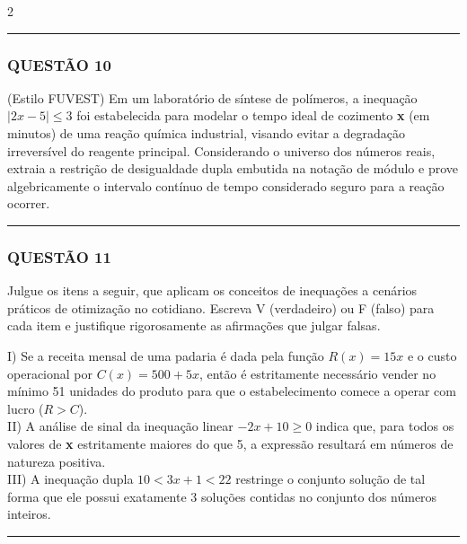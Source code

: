 \documentclass[11pt, a4paper]{article}
\begin{document}
\begin{multicols*}{2}
\vspace{0cm} \noindent\textcolor{CorLinha}{\rule{\linewidth}{0.5pt}} \vspace{-0.2cm}
\subsubsection*{QUESTÃO 10}
(Estilo FUVEST) Em um laboratório de síntese de polímeros, a inequação $ |2x - 5| \le 3 $ foi estabelecida para modelar o tempo ideal de cozimento \textbf{x} (em minutos) de uma reação química industrial, visando evitar a degradação irreversível do reagente principal. Considerando o universo dos números reais, extraia a restrição de desigualdade dupla embutida na notação de módulo e prove algebricamente o intervalo contínuo de tempo considerado seguro para a reação ocorrer.

\vspace{0cm} \noindent\textcolor{CorLinha}{\rule{\linewidth}{0.5pt}} \vspace{-0.2cm}
\subsubsection*{QUESTÃO 11}
Julgue os itens a seguir, que aplicam os conceitos de inequações a cenários práticos de otimização no cotidiano. Escreva V (verdadeiro) ou F (falso) para cada item e justifique rigorosamente as afirmações que julgar falsas.

I) Se a receita mensal de uma padaria é dada pela função $ R(x) = 15x $ e o custo operacional por $ C(x) = 500 + 5x $, então é estritamente necessário vender no mínimo 51 unidades do produto para que o estabelecimento comece a operar com lucro ($ R > C $).\\[0.3cm]
II) A análise de sinal da inequação linear $ -2x + 10 \ge 0 $ indica que, para todos os valores de \textbf{x} estritamente maiores do que 5, a expressão resultará em números de natureza positiva.\\[0.3cm]
III) A inequação dupla $ 10 < 3x + 1 < 22 $ restringe o conjunto solução de tal forma que ele possui exatamente 3 soluções contidas no conjunto dos números inteiros.

\vspace{0cm} \noindent\textcolor{CorLinha}{\rule{\linewidth}{0.5pt}} \vspace{-0.2cm}

\end{multicols*}
\end{document}
